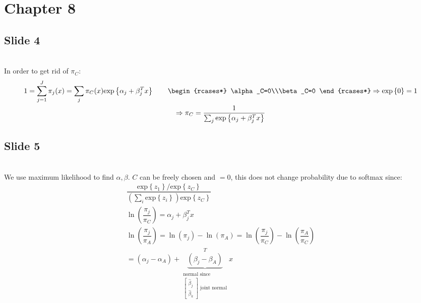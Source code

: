 \section{Chapter 8}
\subsection{Slide 4}\hfill\\
\noindent In order to get rid of $\pi_C$:
\begin{equation*}
  \begin{gathered}
    1=\sum_{j=1}^{J}\pi_j(x) = \sum_j\pi_C(x)\text{exp}\left\{\alpha_j+\beta_j^Tx\right\}\qquad
    \begin{rcases*}
      \alpha_C=0\\\beta_C=0
    \end{rcases*}\Rightarrow \text{exp}\left\{0\right\}=1\\
    \Rightarrow\pi_C = \dfrac{1}{\sum_j\text{exp}\left\{\alpha_j+\beta_j^Tx\right\}}
  \end{gathered}
\end{equation*}
\par\bigskip
\subsection{Slide 5}\hfill\\
\noindent We use maximum likelihood to find $\alpha,\beta$. $C$ can be freely chosen and $=0$, this does not change probability due to softmax since:
\begin{equation*}
  \begin{gathered}
    \dfrac{\text{exp}\left\{z_1\right\}/\text{exp}\left\{z_C\right\}}{\left(\sum_{i}\text{exp}\left\{z_i\right\}\right)\text{exp}\left\{z_C\right\}}\\
    \ln{\left(\dfrac{\pi_j}{\pi_C}\right)}=\alpha_j+\beta_j^Tx\\
    \ln{\left(\dfrac{\pi_j}{\pi_A}\right)} = \ln{\left(\pi_j\right)}-\ln{\left(\pi_A\right)} = \ln{\left(\dfrac{\pi_j}{\pi_C}\right)}-\ln{\left(\dfrac{\pi_A}{\pi_C}\right)}\\
    = (\alpha_j-\alpha_A)+\underbrace{(\beta_j-\beta_A)}_{\substack{\text{normal since}\\\begin{bmatrix}\widehat{\beta}_j\\\widehat{\beta}_k\end{bmatrix}\text{ joint normal}}}^Tx
  \end{gathered}
\end{equation*}
\par\bigskip
